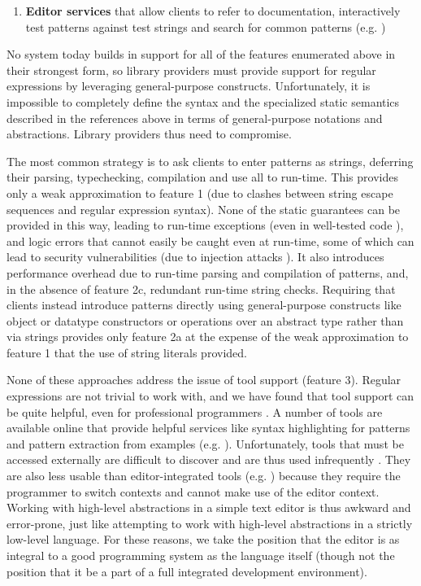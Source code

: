 \begin{enumerate}
\item \textbf{Editor services} that allow clients to refer to documentation, interactively test patterns against test strings and search for common patterns (e.g. \cite{IntelliJRegexp})
\end{enumerate}

No system today builds in support for all of the features enumerated above in their strongest form, so library providers must provide support for regular expressions by leveraging  general-purpose constructs. Unfortunately, it is impossible to completely define the syntax and the specialized static semantics described in the references above in terms of general-purpose notations and abstractions. Library providers thus need to compromise. 

The most common strategy is to ask clients to enter patterns as strings, deferring their parsing, typechecking, compilation and use all to run-time. This provides only a weak approximation to feature 1 (due to clashes between string escape sequences and regular expression syntax). None of the static guarantees can be provided in this way, leading to run-time exceptions (even in well-tested code \cite{spishak2012type}), and logic errors that cannot easily be caught even at run-time, some of which can lead to security vulnerabilities (due to injection attacks \cite{owasp2013}). It also introduces performance overhead due to run-time parsing and compilation of patterns, and, in the absence of feature 2c,   redundant run-time string checks. 
Requiring that clients instead introduce patterns directly using general-purpose constructs like object or datatype constructors or operations over an abstract type rather than via strings provides only feature 2a at the expense of the weak approximation to feature 1 that the use of string literals provided. 

None of these approaches address the issue of tool support (feature 3). Regular expressions are not trivial to work with, and we have found that tool support can be quite helpful, even for professional programmers \cite{Omar:2012:ACC:2337223.2337324}. A number of tools are available online that provide helpful services like syntax highlighting for patterns and pattern extraction from examples (e.g. \cite{_txt2re:_????}). Unfortunately, tools that must be accessed externally are difficult to discover and are thus used infrequently \cite{Murphy-Hill:2011:PIE:1958824.1958888,Campbell:2008:DRT:1636642.1636651,Omar:2012:ACC:2337223.2337324}. They are also less usable than editor-integrated tools (e.g. \cite{IntelliJRegexp}) because they require the programmer to switch contexts  and cannot make use of the editor context. Working with high-level abstractions in a simple text editor is thus awkward and error-prone, just like attempting to work with high-level abstractions in a strictly low-level language. For these reasons, we take the position that the editor is as integral to a good programming system as the language itself (though not the position that it be a part of a full integrated development environment).
